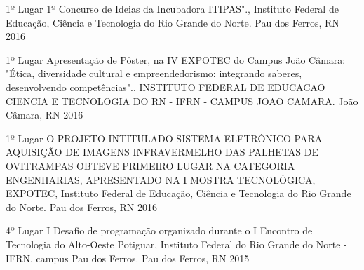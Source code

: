 \begin{cvhonors}

  \cvhonor
    {1º Lugar} %
    {1º Concurso de Ideias da Incubadora ITIPAS"., Instituto Federal de Educação, Ciência e Tecnologia do Rio Grande do Norte.} %
    {Pau dos Ferros, RN} %
    {2016} %

  \cvhonor
    {1º Lugar} %
    {Apresentação de Pôster, na IV EXPOTEC do Campus João Câmara: "Ética, diversidade cultural e empreendedorismo: integrando saberes, desenvolvendo competências"., INSTITUTO FEDERAL DE EDUCACAO CIENCIA E TECNOLOGIA DO RN - IFRN - CAMPUS JOAO CAMARA.} %
    {João Câmara, RN} %
    {2016} %

  \cvhonor
    {1º Lugar} %
    {O PROJETO INTITULADO SISTEMA ELETRÔNICO PARA AQUISIÇÃO DE IMAGENS INFRAVERMELHO DAS PALHETAS DE OVITRAMPAS OBTEVE PRIMEIRO LUGAR NA CATEGORIA ENGENHARIAS, APRESENTADO NA I MOSTRA TECNOLÓGICA, EXPOTEC, Instituto Federal de Educação, Ciência e Tecnologia do Rio Grande do Norte.} %
    {Pau dos Ferros, RN} %
    {2016} %

  \cvhonor
    {4º Lugar} %
    {I Desafio de programação organizado durante o I Encontro de Tecnologia do Alto-Oeste Potiguar, Instituto Federal do Rio Grande do Norte - IFRN, campus Pau dos Ferros.} %
    {Pau dos Ferros, RN} %
    {2015} %

\end{cvhonors}
